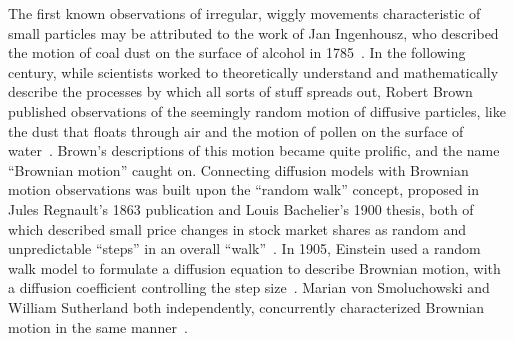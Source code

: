 The first known observations of irregular, wiggly movements characteristic of small particles may be attributed to the work of Jan Ingenhousz, who described the motion of coal dust on the surface of alcohol in 1785~\cite{ingenhousz_new_1785}. In the following century, while scientists worked to theoretically understand and mathematically describe the processes by which all sorts of stuff spreads out, Robert Brown published observations of the seemingly random motion of diffusive particles, like the dust that floats through air and the motion of pollen on the surface of water~\cite{brown_xxvii_1828,brown_xxiv_1829,van_der_pas_discovery_1971}. Brown's descriptions of this motion became quite prolific, and the name ``Brownian motion'' caught on. Connecting diffusion models with Brownian motion observations was built upon the ``random walk'' concept, proposed in Jules Regnault's 1863 publication and Louis Bachelier's 1900 thesis, both of which described small price changes in stock market shares as random and unpredictable ``steps'' in an overall ``walk''~\cite{regnault_calcul_1863,bachelier_theorie_1900}. In 1905, Einstein used a random walk model to formulate a diffusion equation to describe Brownian motion, with a diffusion coefficient controlling the step size~\cite{einstein_uber_1905}. Marian von Smoluchowski and William Sutherland both independently, concurrently characterized Brownian motion in the same manner~\cite{sutherland_lxxv_1905,von_smoluchowski_zur_1906}. 

